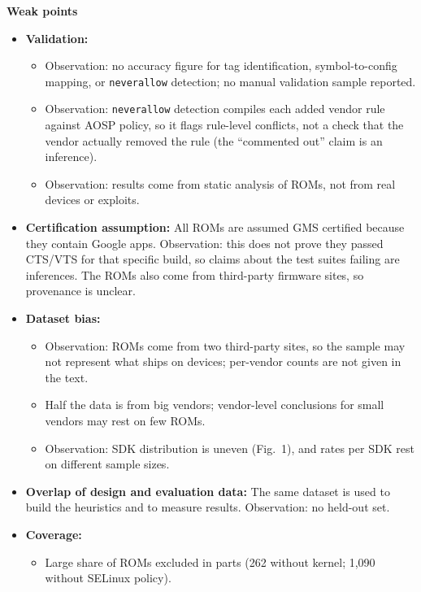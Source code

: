 \documentclass[11pt,a4paper]{article}
\begin{document}
\begin{enumerate}
    \vspace{4pt}
    \textbf{Weak points}
    \begin{itemize}[leftmargin=*,itemsep=1pt,topsep=2pt]
        \item \textbf{Validation:}
        \begin{itemize}[itemsep=0pt]
            \item Observation: no accuracy figure for tag identification, symbol-to-config mapping, or \texttt{neverallow} detection; no manual validation sample reported.
            \item Observation: \texttt{neverallow} detection compiles each added vendor rule against AOSP policy, so it flags rule-level conflicts, not a check that the vendor actually removed the rule (the ``commented out'' claim is an inference).
            \item Observation: results come from static analysis of ROMs, not from real devices or exploits.
        \end{itemize}
        \item \textbf{Certification assumption:} All ROMs are assumed GMS certified because they contain Google apps. Observation: this does not prove they passed CTS/VTS for that specific build, so claims about the test suites failing are inferences. The ROMs also come from third-party firmware sites, so provenance is unclear.
        \item \textbf{Dataset bias:}
        \begin{itemize}[itemsep=0pt]
            \item Observation: ROMs come from two third-party sites, so the sample may not represent what ships on devices; per-vendor counts are not given in the text.
            \item Half the data is from big vendors; vendor-level conclusions for small vendors may rest on few ROMs.
            \item Observation: SDK distribution is uneven (Fig.~1), and rates per SDK rest on different sample sizes.
        \end{itemize}
        \item \textbf{Overlap of design and evaluation data:} The same dataset is used to build the heuristics and to measure results. Observation: no held-out set.
        \item \textbf{Coverage:}
        \begin{itemize}[itemsep=0pt]
            \item Large share of ROMs excluded in parts (262 without kernel; 1,090 without SELinux policy).

\end{itemize}
\end{itemize}
\end{enumerate}
\end{document}
